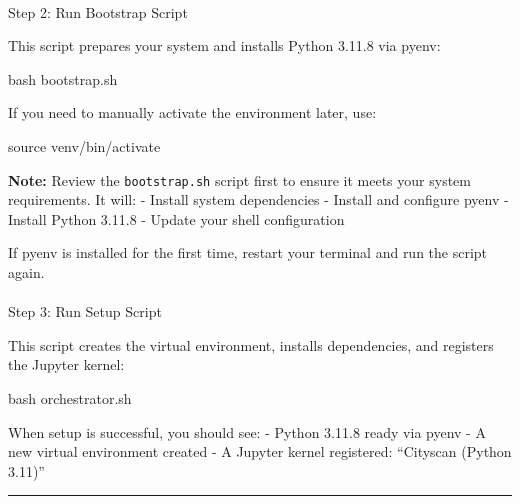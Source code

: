 \documentclass[
  letterpaper,
  DIV=11,
  numbers=noendperiod]{scrreprt}
\makeatletter
\let\oldparagraph\paragraph
\renewcommand{\paragraph}{
    \@ifstar
      \xxxParagraphStar
      \xxxParagraphNoStar
  }
\newcommand{\xxxParagraphStar}[1]{\oldparagraph*{#1}\mbox{}}
\newcommand{\xxxParagraphNoStar}[1]{\oldparagraph{#1}\mbox{}}
\newenvironment{Shaded}{\begin{snugshade}}{\end{snugshade}}
\newcommand{\BuiltInTok}[1]{\textcolor[rgb]{0.00,0.23,0.31}{#1}}
\newcommand{\FunctionTok}[1]{\textcolor[rgb]{0.28,0.35,0.67}{#1}}
\newcommand{\NormalTok}[1]{\textcolor[rgb]{0.00,0.23,0.31}{#1}}
\makeatother
\begin{document}
\paragraph{Step 2: Run Bootstrap
Script}\label{step-2-run-bootstrap-script}

This script prepares your system and installs Python 3.11.8 via pyenv:

\begin{Shaded}
\begin{Highlighting}[]
\FunctionTok{bash}\NormalTok{ bootstrap.sh}
\end{Highlighting}
\end{Shaded}

If you need to manually activate the environment later, use:

\begin{Shaded}
\begin{Highlighting}[]
\BuiltInTok{source}\NormalTok{ venv/bin/activate}
\end{Highlighting}
\end{Shaded}

\textbf{Note:} Review the \texttt{bootstrap.sh} script first to ensure
it meets your system requirements. It will: - Install system
dependencies - Install and configure pyenv - Install Python 3.11.8 -
Update your shell configuration

If pyenv is installed for the first time, restart your terminal and run
the script again.

\paragraph{Step 3: Run Setup Script}\label{step-3-run-setup-script}

This script creates the virtual environment, installs dependencies, and
registers the Jupyter kernel:

\begin{Shaded}
\begin{Highlighting}[]
\FunctionTok{bash}\NormalTok{ orchestrator.sh}
\end{Highlighting}
\end{Shaded}

When setup is successful, you should see: - Python 3.11.8 ready via
pyenv - A new virtual environment created - A Jupyter kernel registered:
``Cityscan (Python 3.11)''

\begin{center}\rule{0.5\linewidth}{0.5pt}\end{center}
\end{document}
